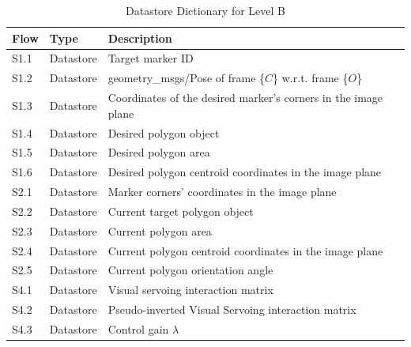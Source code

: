 \begin{table}[!h]
	\caption{Datastore Dictionary for Level B}
	\label{tab:DD-LB-b}
	\centering
	\begin{tabular}{lll}
		\toprule
		Flow & Type & Description \\
		\midrule
		S1.1 & Datastore & Target marker ID \\
		S1.2 & Datastore & geometry\_msgs/Pose of frame \{$C$\} w.r.t. frame \{$O$\} \\
		S1.3 & Datastore & Coordinates of the desired marker's corners in the image plane \\
		S1.4 & Datastore & Desired polygon object \\
		S1.5 & Datastore & Desired polygon area \\
		S1.6 & Datastore & Desired polygon centroid coordinates in the image plane \\
		S2.1 & Datastore & Marker corners' coordinates in the image plane \\
		S2.2 & Datastore & Current target polygon object  \\
		S2.3 & Datastore & Current polygon area \\
		S2.4 & Datastore & Current polygon centroid coordinates in the image plane \\
		S2.5 & Datastore & Current polygon orientation angle \\	
		S4.1 & Datastore & Visual servoing interaction matrix \\	
		S4.2 & Datastore & Pseudo-inverted Visual Servoing interaction matrix \\
		S4.3 & Datastore & Control gain $\lambda$ \\
		\bottomrule
	\end{tabular}
\end{table}